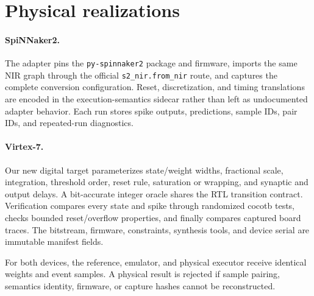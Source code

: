 \section{Physical realizations}

\paragraph{SpiNNaker2.}
The adapter pins the \texttt{py-spinnaker2} package and firmware, imports the same
NIR graph through the official \texttt{s2\_nir.from\_nir} route, and captures the
complete conversion configuration. Reset, discretization, and timing translations
are encoded in the execution-semantics sidecar rather than left as undocumented
adapter behavior. Each run stores spike outputs, predictions, sample IDs, pair
IDs, and repeated-run diagnostics.

\paragraph{Virtex-7.}
Our new digital target parameterizes state/weight widths, fractional scale,
integration, threshold order, reset rule, saturation or wrapping, and synaptic
and output delays. A bit-accurate integer oracle shares the RTL transition
contract. Verification compares every state and spike through randomized cocotb
tests, checks bounded reset/overflow properties, and finally compares captured
board traces. The bitstream, firmware, constraints, synthesis tools, and device
serial are immutable manifest fields.

For both devices, the reference, emulator, and physical executor receive
identical weights and event samples. A physical result is rejected if sample
pairing, semantics identity, firmware, or capture hashes cannot be reconstructed.

